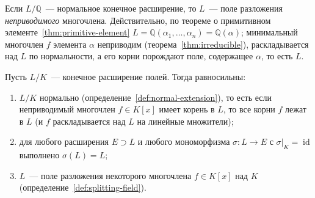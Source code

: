 \documentclass[12pt]{article}
\begin{document}
	\begin{note}
		Если $L/\mathbb{Q}$~--- нормальное конечное расширение, то $L$~--- поле разложения \emph{неприводимого} многочлена. Действительно, по теореме о примитивном элементе~\ref{thm:primitive-element} $L = \mathbb{Q}(\alpha_1, \ldots, \alpha_n) = \mathbb{Q}(\alpha)$; минимальный многочлен $f$ элемента $\alpha$ неприводим (теорема~\ref{thm:irreducible}), раскладывается над $L$ по нормальности, а его корни порождают поле, содержащее $\alpha$, то есть $L$.
	\end{note}

	\begin{theorem}\label{thm:normal-equivalent}
		Пусть $L/K$~--- конечное расширение полей. Тогда равносильны:
		\begin{enumerate}
			\item[(1)] $L/K$ нормально (определение~\ref{def:normal-extension}), то есть если неприводимый многочлен $f \in K[x]$ имеет корень в $L$, то все корни $f$ лежат в $L$ (и $f$ раскладывается над $L$ на линейные множители);
			\item[(2)] для любого расширения $E \supset L$ и любого мономорфизма $\sigma: L \to E$ с $\sigma|_K = \operatorname{id}$ выполнено $\sigma(L) = L$;
			\item[(3)] $L$~--- поле разложения некоторого многочлена $f \in K[x]$ над $K$ (определение~\ref{def:splitting-field}).
		\end{enumerate}
	\end{theorem}
\end{document}
